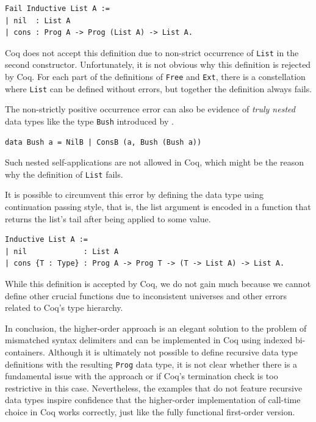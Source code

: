 \documentclass[a4paper, 11pt, fleqn, twoside, abstract=on]{scrreprt}
\newcommand{\hinl}[1]{\texttt{#1}}
\newcommand{\cinl}[1]{\texttt{#1}}
\begin{document}
\begin{verbatim}
Fail Inductive List A :=
| nil  : List A
| cons : Prog A -> Prog (List A) -> List A.
\end{verbatim}

Coq does not accept this definition due to non-strict occurrence of \cinl{List} in the second constructor.
Unfortunately, it is not obvious why this definition is rejected by Coq.
For each part of the definitions of \cinl{Free} and \cinl{Ext}, there is a constellation where \cinl{List} can be defined without errors, but together the definition always fails.

The non-strictly positive occurrence error can also be evidence of \textit{truly nested} data types like the type \hinl{Bush} introduced by \citet{bird1998nested}.

\begin{verbatim}
data Bush a = NilB | ConsB (a, Bush (Bush a))
\end{verbatim}

Such nested self-applications are not allowed in Coq, which might be the reason why the definition of \cinl{List} fails.

It is possible to circumvent this error by defining the data type using continuation passing style, that is, the list argument is encoded in a function that returns the list's tail after being applied to some value.

\begin{verbatim}
Inductive List A :=
| nil             : List A
| cons {T : Type} : Prog A -> Prog T -> (T -> List A) -> List A.
\end{verbatim}
\noindent
While this definition is accepted by Coq, we do not gain much because we cannot define other crucial functions due to inconsistent universes and other errors related to Coq's type hierarchy.

In conclusion, the higher-order approach is an elegant solution to the problem of mismatched syntax delimiters and can be implemented in Coq using indexed bi-containers.
Although it is ultimately not possible to define recursive data type definitions with the resulting \cinl{Prog} data type, it is not clear whether there is a fundamental issue with the approach or if Coq's termination check is too restrictive in this case.
Nevertheless, the examples that do not feature recursive data types inspire confidence that the higher-order implementation of call-time choice in Coq works correctly, just like the fully functional first-order version.
\end{document}
